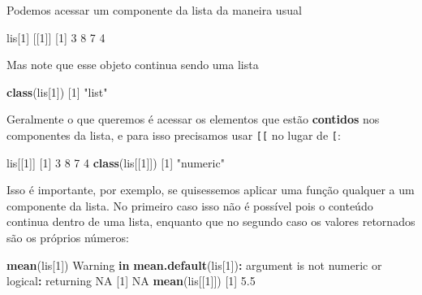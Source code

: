 \documentclass[10pt,a4paper]{book}
\newenvironment{Shaded}{\begin{snugshade}}{\end{snugshade}}
\newcommand{\KeywordTok}[1]{\textcolor[rgb]{0.13,0.29,0.53}{\textbf{#1}}}
\newcommand{\DecValTok}[1]{\textcolor[rgb]{0.00,0.00,0.81}{#1}}
\newcommand{\FloatTok}[1]{\textcolor[rgb]{0.00,0.00,0.81}{#1}}
\newcommand{\StringTok}[1]{\textcolor[rgb]{0.31,0.60,0.02}{#1}}
\newcommand{\OtherTok}[1]{\textcolor[rgb]{0.56,0.35,0.01}{#1}}
\newcommand{\ControlFlowTok}[1]{\textcolor[rgb]{0.13,0.29,0.53}{\textbf{#1}}}
\newcommand{\OperatorTok}[1]{\textcolor[rgb]{0.81,0.36,0.00}{\textbf{#1}}}
\newcommand{\NormalTok}[1]{#1}
\begin{document}
Podemos acessar um componente da lista da maneira usual

\begin{Shaded}
\begin{Highlighting}[]
\NormalTok{lis[}\DecValTok{1}\NormalTok{]}
\NormalTok{[[}\DecValTok{1}\NormalTok{]]}
\NormalTok{[}\DecValTok{1}\NormalTok{] }\DecValTok{3} \DecValTok{8} \DecValTok{7} \DecValTok{4}
\end{Highlighting}
\end{Shaded}

Mas note que esse objeto continua sendo uma lista

\begin{Shaded}
\begin{Highlighting}[]
\KeywordTok{class}\NormalTok{(lis[}\DecValTok{1}\NormalTok{])}
\NormalTok{[}\DecValTok{1}\NormalTok{] }\StringTok{"list"}
\end{Highlighting}
\end{Shaded}

Geralmente o que queremos é acessar os elementos que estão
\textbf{contidos} nos componentes da lista, e para isso precisamos usar
\texttt{{[}{[}} no lugar de \texttt{{[}}:

\begin{Shaded}
\begin{Highlighting}[]
\NormalTok{lis[[}\DecValTok{1}\NormalTok{]]}
\NormalTok{[}\DecValTok{1}\NormalTok{] }\DecValTok{3} \DecValTok{8} \DecValTok{7} \DecValTok{4}
\KeywordTok{class}\NormalTok{(lis[[}\DecValTok{1}\NormalTok{]])}
\NormalTok{[}\DecValTok{1}\NormalTok{] }\StringTok{"numeric"}
\end{Highlighting}
\end{Shaded}

Isso é importante, por exemplo, se quisessemos aplicar uma função
qualquer a um componente da lista. No primeiro caso isso não é possível
pois o conteúdo continua dentro de uma lista, enquanto que no segundo
caso os valores retornados são os próprios números:

\begin{Shaded}
\begin{Highlighting}[]
\KeywordTok{mean}\NormalTok{(lis[}\DecValTok{1}\NormalTok{])}
\NormalTok{Warning }\ControlFlowTok{in} \KeywordTok{mean.default}\NormalTok{(lis[}\DecValTok{1}\NormalTok{])}\OperatorTok{:}\StringTok{ }\NormalTok{argument is not numeric or logical}\OperatorTok{:}
\NormalTok{returning }\OtherTok{NA}
\NormalTok{[}\DecValTok{1}\NormalTok{] }\OtherTok{NA}
\KeywordTok{mean}\NormalTok{(lis[[}\DecValTok{1}\NormalTok{]])}
\NormalTok{[}\DecValTok{1}\NormalTok{] }\FloatTok{5.5}
\end{Highlighting}
\end{Shaded}
\end{document}
